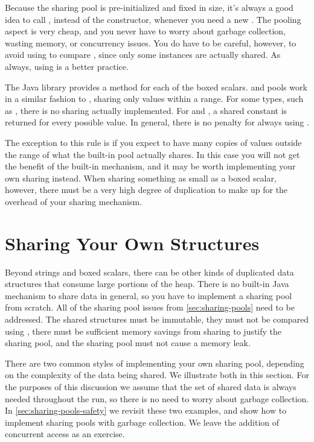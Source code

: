 Because the  sharing pool is pre-initialized and fixed in size,
it's always a good idea to call , instead of
the constructor, whenever you need a new . The pooling aspect is
very cheap, and you never have to worry about garbage collection, wasting memory, or concurrency issues.
You do have to be careful, however, to avoid using \code{==} to compare
, since only some instances are actually shared. 
As always, using  is a better practice.

The Java library provides a  method for each of the boxed
scalars.  and  pools work in a similar fashion
to , sharing only values within a range. For some types,
such as , there is no sharing actually implemented. For
 and , a shared constant is returned for every possible value. 
In general, there is no penalty for always using .

The exception to this rule is if you expect to have many copies
of values outside the range of what the built-in pool
actually shares. In this case you will not get the benefit of the built-in
mechanism, and it may be worth implementing your own sharing instead.  When
sharing something as small as a boxed scalar, however, there must be a very
high degree of duplication to make up for the overhead of your
sharing mechanism.

\section{Sharing Your Own Structures}
\label{sec:canonicalizing-maps}

Beyond strings and boxed scalars, there can be other kinds of
duplicated data structures that consume large portions of the heap. 
There is no built-in Java mechanism to share data
in general, so you have to implement a sharing pool from
scratch. All of the sharing pool issues from \autoref{sec:sharing-pools} need
to be addressed. The shared structures must be immutable, they must not be
compared using \code{==}, there must be sufficient memory savings from sharing
to justify the sharing pool, and the sharing pool must not cause a memory leak. 

There are two common styles of implementing your own sharing pool, depending on
the complexity of the data being shared.  We illustrate both in this section. 
For the purposes of this discussion we assume that the set of shared data is
always needed throughout the run, so there is no need to worry about garbage collection. In
\autoref{sec:sharing-pools-safety} we revisit these two examples, and show how
to implement sharing pools with garbage collection.  
We leave the addition of concurrent access as an exercise. 

